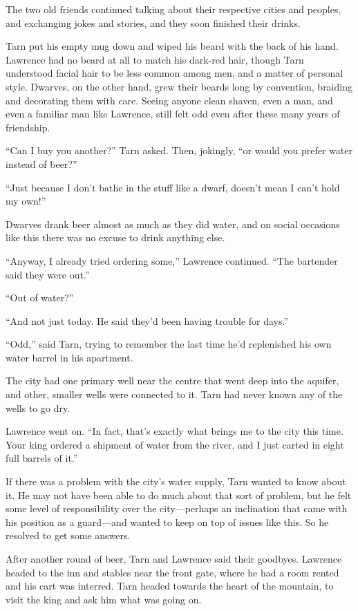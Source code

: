 The two old friends continued talking about their respective cities and peoples, and exchanging jokes and stories, and they soon finished their drinks.

Tarn put his empty mug down and wiped his beard with the back of his hand.  Lawrence had no beard at all to match his dark-red hair, though Tarn understood facial hair to be less common among men, and a matter of personal style.  Dwarves, on the other hand, grew their beards long by convention, braiding and decorating them with care.  Seeing anyone clean shaven, even a man, and even a familiar man like Lawrence, still felt odd even after these many years of friendship.

``Can I buy you another?'' Tarn asked.  Then, jokingly, ``or would you prefer water instead of beer?''

``Just because I don't bathe in the stuff like a dwarf, doesn't mean I can't hold my own!''

Dwarves drank beer almost as much as they did water, and on social occasions like this there was no excuse to drink anything else.

``Anyway, I already tried ordering some,'' Lawrence continued.  ``The bartender said they were out.''

``Out of water?''

``And not just today.  He said they'd been having trouble for days.''

``Odd,'' said Tarn, trying to remember the last time he'd replenished his own water barrel in his apartment.

The city had one primary well near the centre that went deep into the aquifer, and other, smaller wells were connected to it.  Tarn had never known any of the wells to go dry.

Lawrence went on.  ``In fact, that's exactly what brings me to the city this time.  Your king ordered a shipment of water from the river, and I just carted in eight full barrels of it.''

If there was a problem with the city's water supply, Tarn wanted to know about it.  He may not have been able to do much about that sort of problem, but he felt some level of responsibility over the city---perhaps an inclination that came with his position as a guard---and wanted to keep on top of issues like this.  So he resolved to get some answers.

After another round of beer, Tarn and Lawrence said their goodbyes. Lawrence headed to the inn and stables near the front gate, where he had a room rented and his cart was interred.  Tarn headed towards the heart of the mountain, to visit the king and ask him what was going on.

